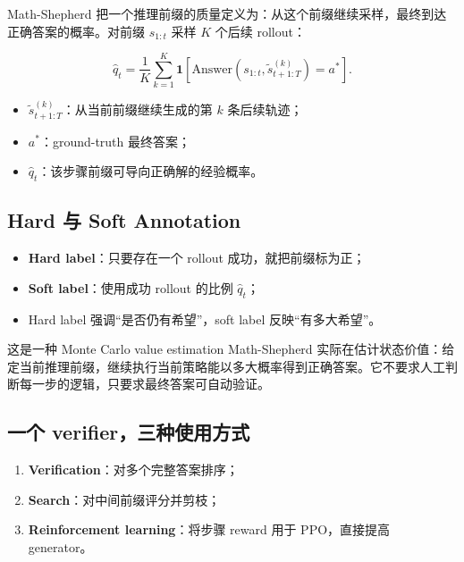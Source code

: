 \documentclass[a4paper]{article}
\begin{document}
Math-Shepherd 把一个推理前缀的质量定义为：从这个前缀继续采样，最终到达正确答案的概率。对前缀 $s_{1:t}$ 采样 $K$ 个后续 rollout：

$$
\hat q_t=\frac{1}{K}\sum_{k=1}^{K}
\mathbf 1\!\left[\mathrm{Answer}(s_{1:t},\tilde s^{(k)}_{t+1:T})=a^*\right].
$$

\begin{itemize}
    \item $\tilde s^{(k)}_{t+1:T}$：从当前前缀继续生成的第 $k$ 条后续轨迹；
    \item $a^*$：ground-truth 最终答案；
    \item $\hat q_t$：该步骤前缀可导向正确解的经验概率。
\end{itemize}


\subsection{Hard 与 Soft Annotation}

\begin{itemize}
    \item \textbf{Hard label}：只要存在一个 rollout 成功，就把前缀标为正；
    \item \textbf{Soft label}：使用成功 rollout 的比例 $\hat q_t$；
    \item Hard label 强调“是否仍有希望”，soft label 反映“有多大希望”。
\end{itemize}


\begin{knowledgebox}{这是一种 Monte Carlo value estimation}
Math-Shepherd 实际在估计状态价值：给定当前推理前缀，继续执行当前策略能以多大概率得到正确答案。它不要求人工判断每一步的逻辑，只要求最终答案可自动验证。
\end{knowledgebox}

\subsection{一个 verifier，三种使用方式}


\begin{enumerate}
    \item \textbf{Verification}：对多个完整答案排序；
    \item \textbf{Search}：对中间前缀评分并剪枝；
    \item \textbf{Reinforcement learning}：将步骤 reward 用于 PPO，直接提高 generator。
\end{enumerate}
\end{document}
